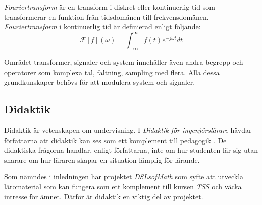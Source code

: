 \documentclass[]{article}
\begin{document}
\textit{Fouriertransform} är en transform i diskret eller
kontinuerlig tid som transformerar en funktion från tidsdomänen till
frekvensdomänen. \textit{Fouriertransform} i kontinuerlig tid är
definierad enligt följande:
\[\mathcal{F}[f] (\omega)
= \int_{-\infty}^{\infty} f(t) e^{-j \omega t} dt\]






Området transformer, signaler och system innehåller även andra begrepp
och operatorer som komplexa tal, faltning, sampling med flera. Alla
dessa grundkunskaper behövs för att modulera system och signaler.

\subsection{Didaktik}
Didaktik är vetenskapen om undervisning. I \textit{Didaktik för
 ingenjörslärare} hävdar författarna att didaktik kan ses som ett
komplement till pedagogik \cite{didaktik_for_ingenjorslarare}. De didaktiska frågorna handlar, enligt
författarna, inte om hur studenten lär sig utan snarare om hur läraren
skapar en situation lämplig för lärande.

Som nämndes i inledningen har projektet \textit{DSLsofMath}
 som syfte att utveckla läromaterial som kan fungera som ett
komplement till kursen \textit{TSS} och väcka intresse för ämnet.
Därför är didaktik en viktig del av projektet.
\end{document}
